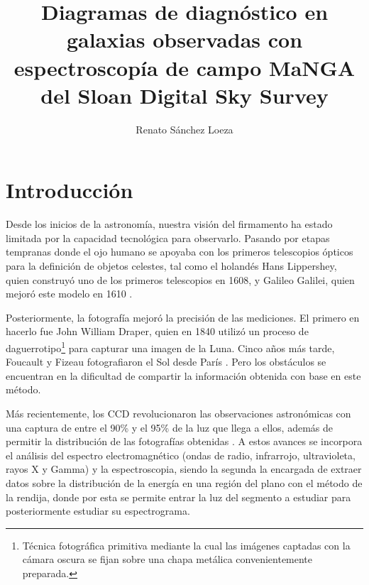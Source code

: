\documentclass[10pt,twocolumn,a4paper]{opticajnl}
\title{Diagramas de diagnóstico en galaxias observadas con espectroscopía de campo MaNGA del Sloan Digital Sky Survey}
\author{Renato Sánchez Loeza}
\begin{document}
\maketitle
\section*{Introducción}
Desde los inicios de la astronomía, nuestra visión del firmamento ha estado limitada por la capacidad tecnológica para observarlo. Pasando por etapas tempranas donde el ojo humano se apoyaba con los primeros telescopios ópticos para la definición de objetos celestes, tal como el holandés Hans Lippershey, quien construyó uno de los primeros telescopios en 1608, y Galileo Galilei, quien mejoró este modelo en 1610 \cite{cana-2015}.

Posteriormente, la fotografía mejoró la precisión de las mediciones. El primero en hacerlo fue John William Draper, quien en 1840 utilizó un proceso de daguerrotipo\footnote{Técnica fotográfica primitiva mediante la cual las imágenes captadas con la cámara oscura se fijan sobre una chapa metálica convenientemente preparada.} para capturar una imagen de la Luna. Cinco años más tarde, Foucault y Fizeau fotografiaron el Sol desde París \cite{olsen2021birth}. Pero los obstáculos se encuentran en la dificultad de compartir la información obtenida con base en este método.

Más recientemente, los CCD revolucionaron las observaciones astronómicas con una captura de entre el 90\% y el 95\% de la luz que llega a ellos, además de permitir la distribución de las fotografías obtenidas \cite{las-cumbres}. A estos avances se incorpora el análisis del espectro electromagnético (ondas de radio, infrarrojo, ultravioleta, rayos X y Gamma) y la espectroscopia, siendo la segunda la encargada de extraer datos sobre la distribución de la energía en una región del plano con el método de la rendija, donde por esta se permite entrar la luz del segmento a estudiar para posteriormente estudiar su espectrograma.
\end{document}
